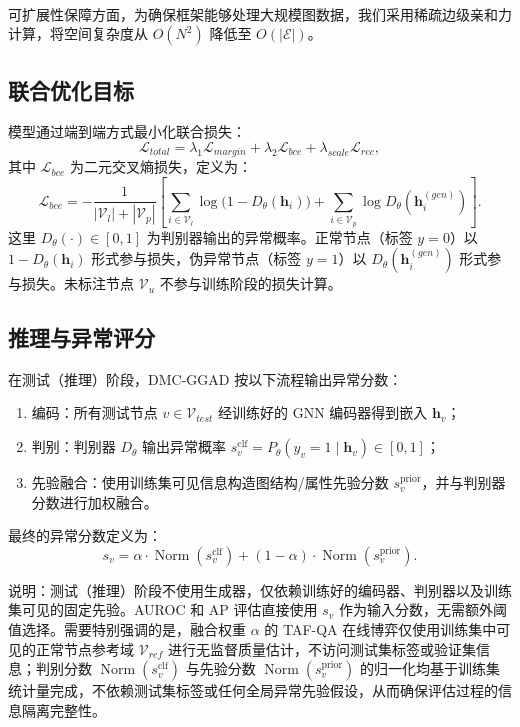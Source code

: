 ﻿﻿﻿﻿    \documentclass[conference, onecolumn]{IEEEtran}
\begin{document}
    可扩展性保障方面，为确保框架能够处理大规模图数据，我们采用稀疏边级亲和力计算，将空间复杂度从 $O(N^2)$ 降低至 $O(|\mathcal{E}|)$。

    \subsection{联合优化目标}
    模型通过端到端方式最小化联合损失：
    \begin{equation}
    \mathcal{L}_{total} = \lambda_1 \mathcal{L}_{margin} + \lambda_2 \mathcal{L}_{bce} + \lambda_{scale} \mathcal{L}_{rec},
    \end{equation}
    其中 $\mathcal{L}_{bce}$ 为二元交叉熵损失，定义为：
    \begin{equation}
    \mathcal{L}_{bce} = -\frac{1}{|\mathcal{V}_l| + |\mathcal{V}_p|} \left[ \sum_{i \in \mathcal{V}_l} \log\bigl(1 - D_\theta(\mathbf{h}_i)\bigr) + \sum_{i \in \mathcal{V}_p} \log D_\theta(\mathbf{h}^{(gen)}_i) \right].
    \end{equation}
    这里 $D_\theta(\cdot) \in [0,1]$ 为判别器输出的异常概率。正常节点（标签 $y=0$）以 $1-D_\theta(\mathbf{h}_i)$ 形式参与损失，伪异常节点（标签 $y=1$）以 $D_\theta(\mathbf{h}^{(gen)}_i)$ 形式参与损失。未标注节点 $\mathcal{V}_u$ 不参与训练阶段的损失计算。

    \subsection{推理与异常评分}
    在测试（推理）阶段，DMC-GGAD 按以下流程输出异常分数：
    
    \begin{enumerate}
        \item 编码：所有测试节点 $v \in \mathcal{V}_{test}$ 经训练好的 GNN 编码器得到嵌入 $\mathbf{h}_v$；
        \item 判别：判别器 $D_\theta$ 输出异常概率 $s_v^{\text{clf}} = P_\theta(y_v = 1 \mid \mathbf{h}_v) \in [0, 1]$；
        \item 先验融合：使用训练集可见信息构造图结构/属性先验分数 $s_v^{\text{prior}}$，并与判别器分数进行加权融合。
    \end{enumerate}
    
    最终的异常分数定义为：
    \begin{equation}
    \boxed{s_v = \alpha \cdot \operatorname{Norm}(s_v^{\text{clf}}) + (1-\alpha)\cdot \operatorname{Norm}(s_v^{\text{prior}})}.
    \end{equation}
    
    \noindent 说明：测试（推理）阶段不使用生成器，仅依赖训练好的编码器、判别器以及训练集可见的固定先验。AUROC 和 AP 评估直接使用 $s_v$ 作为输入分数，无需额外阈值选择。需要特别强调的是，融合权重 $\alpha$ 的 TAF-QA 在线博弈仅使用训练集中可见的正常节点参考域 $\mathcal{V}_{ref}$ 进行无监督质量估计，不访问测试集标签或验证集信息；判别分数 $\operatorname{Norm}(s_v^{\text{clf}})$ 与先验分数 $\operatorname{Norm}(s_v^{\text{prior}})$ 的归一化均基于训练集统计量完成，不依赖测试集标签或任何全局异常先验假设，从而确保评估过程的信息隔离完整性。
\end{document}
